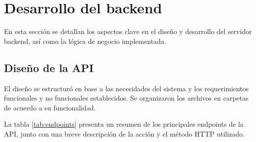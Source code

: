 \section{Desarrollo del backend}

En esta sección se detallan los aspectos clave en el diseño y desarrollo del
servidor backend, así como la lógica de negocio implementada.

\subsection{Diseño de la API}

El diseño se estructuró en base a las necesidades del sistema y los
requerimientos funcionales y no funcionales establecidos. Se organizaron los
archivos en carpetas de acuerdo a su funcionalidad.

La tabla \ref{tab:endpoints} presenta un resumen de los principales endpoints
de la API, junto con una breve descripción de la acción y el método HTTP
utilizado.

